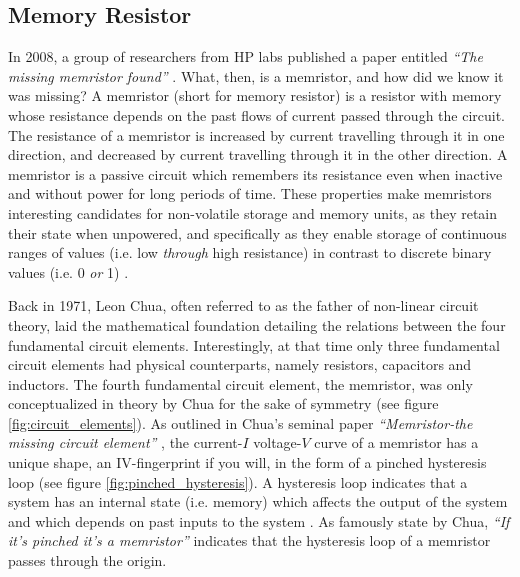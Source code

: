 \subsection{Memory Resistor}

In 2008, a group of researchers from HP labs published a paper entitled \textit{``The missing memristor found''} \cite{hp_memristor_found}. What, then, is a memristor, and how did we know it was missing? A memristor (short for memory resistor) is a resistor with memory whose resistance depends on the past flows of current passed through the circuit. The resistance of a memristor is increased by current travelling through it in one direction, and decreased by current travelling through it in the other direction. A memristor is a passive circuit which remembers its resistance even when inactive and without power for long periods of time. These properties make memristors interesting candidates for non-volatile storage and memory units, as they retain their state when unpowered, and specifically as they enable storage of continuous ranges of values (i.e. low \textit{through} high resistance) in contrast to discrete binary values (i.e. 0 \textit{or} 1) \cite{memristors_a_new_frontier}.

Back in 1971, Leon Chua, often referred to as the father of non-linear circuit theory, laid the mathematical foundation detailing the relations between the four fundamental circuit elements. Interestingly, at that time only three fundamental circuit elements had physical counterparts, namely resistors, capacitors and inductors. The fourth fundamental circuit element, the memristor, was only conceptualized in theory by Chua for the sake of symmetry (see figure \ref{fig:circuit_elements}). As outlined in Chua's seminal paper \textit{``Memristor-the missing circuit element''} \cite{chua_memristor}, the current-$I$ voltage-$V$ curve of a memristor has a unique shape, an IV-fingerprint if you will, in the form of a pinched hysteresis loop (see figure \ref{fig:pinched_hysteresis}). A hysteresis loop indicates that a system has an internal state (i.e. memory) which affects the output of the system and which depends on past inputs to the system \cite{memristor_hayes}. As famously state by Chua, \textit{``If it's pinched it's a memristor''} indicates that the hysteresis loop of a memristor passes through the origin.

